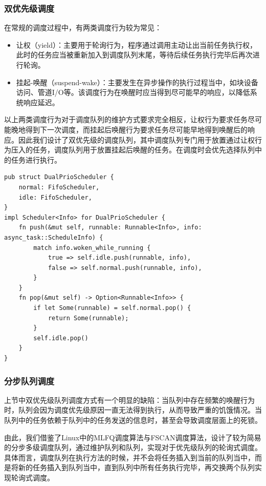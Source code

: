 \documentclass{article}
\begin{document}
\subsubsection{双优先级调度}

在常规的调度过程中，有两类调度行为较为常见：

\begin{itemize}
    \item 让权（yield）：主要用于轮询行为，程序通过调用主动让出当前任务执行权，此时的任务应当被重新加入到调度队列末尾，等待后续任务执行完毕后再次进行轮询。
    \item 挂起-唤醒（suspend-wake）：主要发生在异步操作的执行过程当中，如块设备访问、管道I/O等。该调度行为在唤醒时应当得到尽可能早的响应，以降低系统响应延迟。
\end{itemize}

以上两类调度行为对于调度队列的维护方式要求完全相反，让权行为要求任务尽可能晚地得到下一次调度，而挂起后唤醒行为要求任务尽可能早地得到唤醒后的响应。因此我们设计了双优先级的调度队列，其中调度队列专门用于放置通过让权行为压入的任务，调度队列用于放置挂起后唤醒的任务。在调度时会优先选择队列中的任务进行执行。

\begin{lstlisting}
pub struct DualPrioScheduler {
    normal: FifoScheduler,
    idle: FifoScheduler,
}
impl Scheduler<Info> for DualPrioScheduler {
    fn push(&mut self, runnable: Runnable<Info>, info: async_task::ScheduleInfo) {
        match info.woken_while_running {
            true => self.idle.push(runnable, info),
            false => self.normal.push(runnable, info),
        }
    }
    fn pop(&mut self) -> Option<Runnable<Info>> {
        if let Some(runnable) = self.normal.pop() {
            return Some(runnable);
        }
        self.idle.pop()
    }
}
\end{lstlisting}

\subsubsection{分步队列调度}

上节中双优先级队列调度方式有一个明显的缺陷：当队列中存在频繁的唤醒行为时，队列会因为调度优先级原因一直无法得到执行，从而导致严重的饥饿情况。当队列中的任务依赖于队列中的任务发送的信息时，甚至会导致调度层面上的死锁。

由此，我们借鉴了Linux中的MLFQ调度算法与FSCAN调度算法，设计了较为简易的分步多级调度队列，通过维护队列和队列，实现对于优先级队列的轮询式调度。具体而言，调度队列在执行方法的时候，并不会将任务插入到当前的队列当中，而是将新的任务插入到队列当中，直到队列中所有任务执行完毕，再交换两个队列实现轮询式调度。
\end{document}
